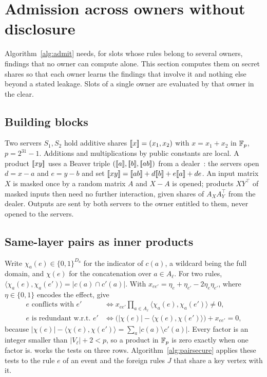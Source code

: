 \section{Admission across owners without disclosure}\label{sec:protocol}

Algorithm~\ref{alg:admit} needs, for slots whose rules belong to several owners, findings that no owner can compute alone. This section computes them on secret shares so that each owner learns the findings that involve it and nothing else beyond a stated leakage. Slots of a single owner are evaluated by that owner in the clear.

\subsection{Building blocks}\label{sec:mpcbasics}
Two servers $S_1, S_2$ hold additive shares $[\![x]\!] = (x_1, x_2)$ with $x = x_1 + x_2$ in $\mathbb{F}_p$, $p = 2^{31}-1$. Additions and multiplications by public constants are local. A product $[\![xy]\!]$ uses a Beaver triple $([\![a]\!], [\![b]\!], [\![ab]\!])$ from a dealer~\cite{beaver1991triples}: the servers open $d = x - a$ and $e = y - b$ and set $\shr{xy} = \shr{ab} + d\shr{b} + e\shr{a} + de$. An input matrix $X$ is masked once by a random matrix $A$ and $X - A$ is opened; products $X Y^{\top}$ of masked inputs then need no further interaction, given shares of $A_X A_Y^{\top}$ from the dealer. Outputs are sent by both servers to the owner entitled to them, never opened to the servers.

\subsection{Same-layer pairs as inner products}\label{sec:pairsecure}
Write $\chi_a(e) \in \{0,1\}^{D_a}$ for the indicator of $c(a)$, a wildcard being the full domain, and $\chi(e)$ for the concatenation over $a \in A_\ell$. For two rules, $\langle \chi_a(e), \chi_a(e')\rangle = |c(a) \cap c'(a)|$. With $x_{ee'} = \eta_e + \eta_{e'} - 2\eta_e\eta_{e'}$, where $\eta \in \{0,1\}$ encodes the effect,  give
\begin{align}
e \text{ conflicts with } e' &\iff x_{ee'} \textstyle\prod_{a \in A_\ell} \langle \chi_a(e), \chi_a(e')\rangle \neq 0, \label{eq:secconf}\\
e \text{ is redundant w.r.t.\ } e' &\iff \bigl(|\chi(e)| - \langle \chi(e), \chi(e')\rangle\bigr) + x_{ee'} = 0, \label{eq:secred}
\end{align}
because $|\chi(e)| - \langle \chi(e), \chi(e')\rangle = \sum_a |c(a) \setminus c'(a)|$. Every factor is an integer smaller than $|V_\ell| + 2 < p$, so a product in $\mathbb{F}_p$ is zero exactly when one factor is.  works the tests on three rows. Algorithm~\ref{alg:pairsecure} applies these tests to the rule $e$ of an event and the foreign rules $J$ that share a key vertex with it.


